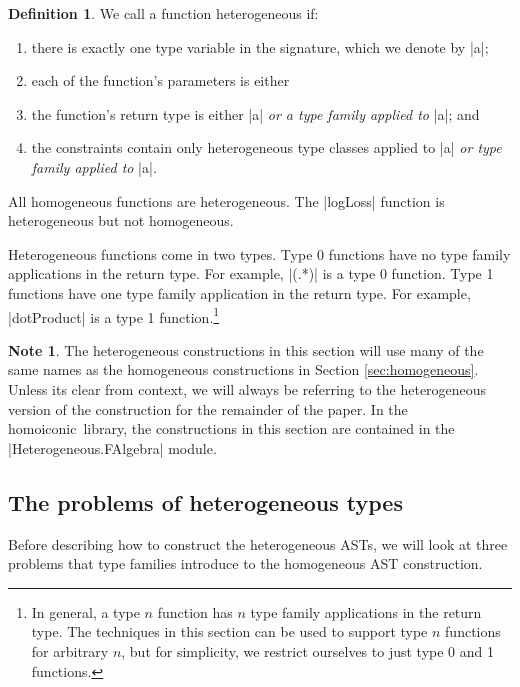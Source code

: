 \documentclass[preprint]{sigplanconf}
\theoremstyle{definition}
\newtheorem{defn}{Definition}
\newtheorem{note}{Note}
\newcommand{\homoiconic}{{\ttfamily homoiconic}~}
\begin{document}
\begin{defn}
We call a function heterogeneous if:
\begin{enumerate}
\item
there is exactly one type variable in the signature, which we denote by |a|;
\item
each of the function's parameters is either
\item
the function's return type is either |a| \emph{or a type family applied to} |a|; and
\item
the constraints contain only heterogeneous type classes applied to |a| \emph{or type family applied to} |a|.
\end{enumerate}
All homogeneous functions are heterogeneous.
The |logLoss| function is heterogeneous but not homogeneous.

Heterogeneous functions come in two types.
Type 0 functions have no type family applications in the return type.
For example, |(.*)| is a type 0 function.
Type 1 functions have one type family application in the return type.
For example, |dotProduct| is a type 1 function.\footnote{
In general, a type $n$ function has $n$ type family applications in the return type.
The techniques in this section can be used to support type $n$ functions for arbitrary $n$,
but for simplicity, we restrict ourselves to just type 0 and 1 functions.
}
\end{defn}

\begin{note}
The heterogeneous constructions in this section will use many of the same names as the homogeneous constructions in Section \ref{sec:homogeneous}.
Unless its clear from context, we will always be referring to the heterogeneous version of the construction for the remainder of the paper.
In the \homoiconic library, the constructions in this section are contained in the |Heterogeneous.FAlgebra| module.
\end{note}

\subsection{The problems of heterogeneous types}
\label{sec:het.probs}
Before describing how to construct the heterogeneous ASTs,
we will look at three problems that type families introduce to the homogeneous AST construction.
\end{document}
